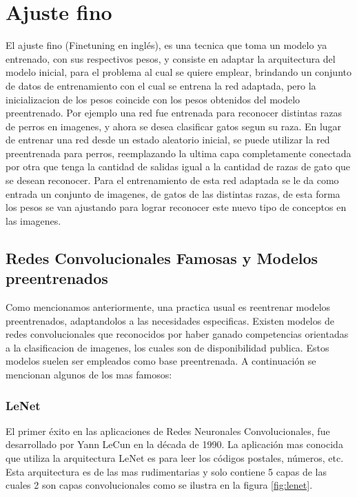 \documentclass[a4paper,11pt,spanish]{book}
\begin{document}
    \section {Ajuste fino} \label{sec:finetuning}
      El ajuste fino (Finetuning en inglés), es una tecnica que toma un modelo ya entrenado, con sus respectivos pesos,  y consiste en adaptar la arquitectura
      del modelo inicial, para el problema al cual se quiere emplear, brindando un conjunto de datos de entrenamiento con el cual se entrena la red adaptada,
      pero la inicializacion de los pesos coincide con los pesos obtenidos del modelo preentrenado.
      Por ejemplo una red fue entrenada para reconocer distintas razas de perros en imagenes, y ahora se desea clasificar gatos segun su raza. En lugar de entrenar una
      red desde un estado aleatorio inicial, se puede utilizar la red preentrenada para perros, reemplazando la ultima capa completamente conectada por otra que
      tenga la cantidad de salidas igual a la cantidad de razas de gato que se desean reconocer.
      Para el entrenamiento de esta red adaptada se le da como entrada un conjunto de imagenes, de gatos de las distintas razas, de esta forma los  pesos se van
      ajustando para lograr reconocer este nuevo tipo de conceptos en las imagenes.
      
      \subsection{Redes Convolucionales Famosas y Modelos preentrenados} \label{sec:cnn_famosas}
	Como mencionamos anteriormente, una practica usual es reentrenar modelos preentrenados, adaptandolos a las necesidades especificas. Existen modelos de redes convolucionales
	que reconocidos por haber ganado competencias orientadas a la clasificacion de imagenes, los cuales son de disponibilidad publica. Estos modelos suelen ser empleados como base 
	preentrenada. A continuación se mencionan algunos de los mas famosos:
	
	\subsubsection{LeNet}
	  El primer éxito en las aplicaciones de Redes Neuronales Convolucionales, fue desarrollado por Yann LeCun \cite{Lecun:LeNet} en la década de 1990.
	  La aplicación mas conocida que utiliza la arquitectura LeNet es para leer los códigos postales, números, etc. Esta arquitectura es de las mas rudimentarias y 
	  solo contiene 5 capas de las cuales 2 son capas convolucionales como se ilustra en la figura \ref{fig:lenet}. 
	  
\end{document}
